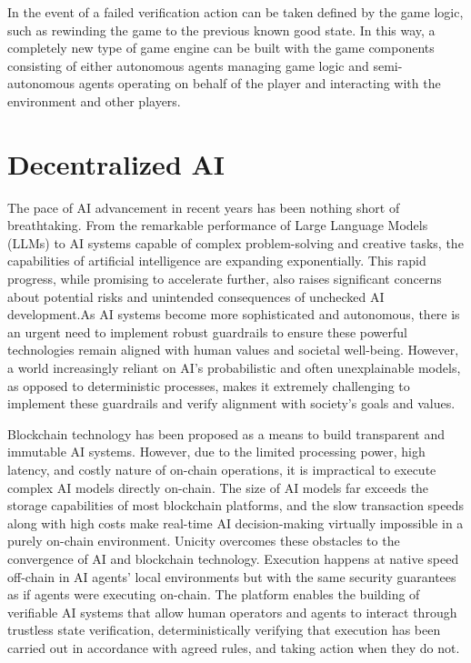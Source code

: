 \documentclass{article}
\begin{document}
In the event of a failed verification action can be taken defined by the game logic, such as rewinding the game to the previous known good state. In this way, a completely new type of game engine can be built with the game components consisting of either autonomous agents managing game logic and semi-autonomous agents operating on behalf of the player and interacting with the environment and other players.

\section{Decentralized AI}



The pace of AI advancement in recent years has been nothing short of breathtaking. From the remarkable performance of Large Language Models (LLMs) to AI systems capable of complex problem-solving and creative tasks, the capabilities of artificial intelligence are expanding exponentially. This rapid progress, while promising to accelerate further, also raises significant concerns about potential risks and unintended consequences of unchecked AI development.As AI systems become more sophisticated and autonomous, there is an urgent need to implement robust guardrails to ensure these powerful technologies remain aligned with human values and societal well-being. However, a world increasingly reliant on AI's probabilistic and often unexplainable models, as opposed to deterministic processes, makes it extremely challenging to implement these guardrails and verify alignment with society's goals and values.

\vspace{2mm}

Blockchain technology has been proposed as a means to build transparent and immutable AI systems. However, due to the limited processing power, high latency, and costly nature of on-chain operations, it is impractical to execute complex AI models directly on-chain. The size of AI models far exceeds the storage capabilities of most blockchain platforms, and the slow transaction speeds along with high costs make real-time AI decision-making virtually impossible in a purely on-chain environment. Unicity overcomes these obstacles to the convergence of AI and blockchain technology. Execution happens at native speed off-chain in AI agents' local environments but with the same security guarantees as if agents were executing on-chain. The platform enables the building of verifiable AI systems that allow human operators and agents to interact through trustless state verification, deterministically verifying that execution has been carried out in accordance with agreed rules, and taking action when they do not.
\end{document}
